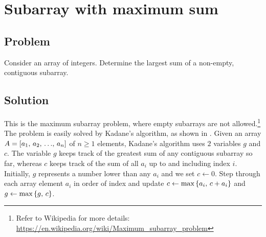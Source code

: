 
\section{Subarray with maximum sum}



\subsection*{Problem}

Consider an array of integers.  Determine the largest sum of a
non-empty, contiguous subarray.



\subsection*{Solution}

This is the maximum subarray problem, where empty subarrays are not
allowed.\footnote{
  Refer to Wikipedia for more details:
  \url{https://en.wikipedia.org/wiki/Maximum_subarray_problem}
}
The problem is easily solved by Kadane's algorithm, as shown in
.  Given an array
$A = \left[ {{a}_1},\, {{a}_2},\, {\dots},\, {{a}_{n}} \right]$ of $n \geq 1$ elements, Kadane's algorithm uses $2$
variables $g$ and $c$.  The variable $g$ keeps track of the greatest
sum of any contiguous subarray so far, whereas $c$ keeps track of the
sum of all $a_i$ up to and including index $i$.  Initially, $g$
represents a number lower than any $a_i$ and we set $c \gets 0$.  Step
through each array element $a_i$ in order of index and update
$c \gets \text{max}\left\{{a_i},\, {c + a_i}\right\}$ and $g \gets \text{max}\left\{{g},\, {c}\right\}$.

\begin{algorithm}[!htbp]

\caption{%
  Kadane's algorithm.
}
\label{alg:subarray:kadane}
\end{algorithm}
